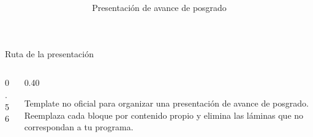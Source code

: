\documentclass{ucbeamer}
\title{\bf \tituloPresentacion}
\subtitle{Presentación de avance de posgrado}
\author[\nombreEstudiante]{\nombreEstudiante}
\date[Fecha]{\fechaPresentacion}
\institute{Pontificia Universidad Católica de Chile}
\begin{document}
\UCtitleframe

\begin{frame}{Ruta de la presentación}
  \begin{columns}[T,onlytextwidth]
    \begin{column}{0.56\textwidth}
      \tableofcontents
    \end{column}
    \begin{column}{0.40\textwidth}
      \begin{UCKeyPoint}
        Template no oficial para organizar una presentación de avance de posgrado. Reemplaza cada bloque por contenido propio y elimina las láminas que no correspondan a tu programa.
      \end{UCKeyPoint}
    \end{column}
  \end{columns}
\end{frame}






\end{document}
